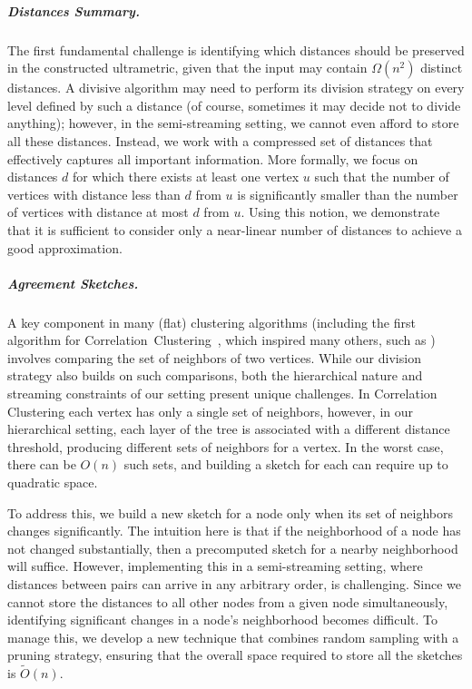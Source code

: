 \documentclass{article}
\begin{document}
\subparagraph*{Distances Summary.} 

The first fundamental challenge is identifying which distances should be preserved in the constructed ultrametric, given that the input may contain $\Omega(n^2)$ distinct distances.
A divisive algorithm may need to perform its division strategy on every level defined by such a distance (of course, sometimes it may decide not to divide anything); however, in the semi-streaming setting, we cannot even afford to store all these distances. 
Instead, we work with a compressed set of distances that effectively captures all important information. More formally, we focus on distances \(d\) for which there exists at least one vertex \(u\) such that the number of vertices with distance less than \(d\) from \(u\) is significantly smaller than the number of vertices with distance at most \(d\) from \(u\). Using this notion, we demonstrate that it is sufficient to consider only a near-linear number of distances to achieve a good approximation.

\subparagraph*{Agreement Sketches.} A key component in many (flat) clustering algorithms 
(including the first algorithm for Correlation~Clustering~\cite{DBLP:conf/focs/BansalBC02}, which inspired many others, such as \cite{cohen2021correlation, Assadi022, cohen2022fitting, abs-2404-06797}) 
involves comparing the set of neighbors of two vertices. While our division strategy also builds on such comparisons, both the hierarchical nature and streaming constraints of our setting present unique challenges.
In Correlation Clustering each vertex has only a single set of neighbors, however, in our hierarchical setting, each layer of the tree is associated with a different distance threshold, producing different sets of neighbors for a vertex. In the worst case, there can be $O(n)$ such sets, and building a sketch for each can require up to quadratic space. 

To address this,
we build a new sketch for a node only when its set of neighbors changes significantly.
The intuition here is that if the neighborhood of a node has not changed substantially, then a precomputed sketch for a nearby neighborhood will suffice. However, implementing this in a semi-streaming
setting, where distances between pairs can arrive in any arbitrary order, is challenging. Since we
cannot store the distances to all other nodes from a given node simultaneously, identifying significant
changes in a node’s neighborhood becomes difficult. To manage this, we develop a new technique that combines random sampling with a pruning strategy, ensuring that the overall space required to store all the sketches is \(\tilde{O}(n)\).
\end{document}
